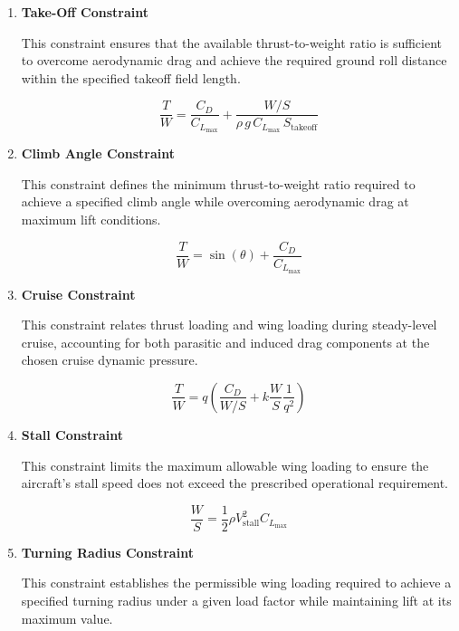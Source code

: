 \documentclass[10pt, letterpaper]{article}
\begin{document}
\begin{enumerate}

\item \textbf{Take-Off Constraint}

This constraint ensures that the available thrust-to-weight ratio is sufficient to overcome aerodynamic drag and achieve the required ground roll distance within the specified takeoff field length.

\begin{equation}
\label{eq:take_off_constraint}
\frac{T}{W} = \frac{C_D}{C_{L_{\max}}}
+ \frac{W/S}{\rho \, g \, C_{L_{\max}} \, S_{\text{takeoff}}}
\end{equation}

\item \textbf{Climb Angle Constraint}

This constraint defines the minimum thrust-to-weight ratio required to achieve a specified climb angle while overcoming aerodynamic drag at maximum lift conditions.

\begin{equation}
\label{eq:climb_angle_constraint}
\frac{T}{W} = \sin(\theta) + \frac{C_D}{C_{L_{\max}}}
\end{equation}

\item \textbf{Cruise Constraint}

This constraint relates thrust loading and wing loading during steady-level cruise, accounting for both parasitic and induced drag components at the chosen cruise dynamic pressure.

\begin{equation}
\label{eq:cruise_constraint}
\frac{T}{W}
= q \left(
\frac{C_D}{W/S}
+ k \frac{W}{S} \frac{1}{q^2}
\right)
\end{equation}

\item \textbf{Stall Constraint}

This constraint limits the maximum allowable wing loading to ensure the aircraft's stall speed does not exceed the prescribed operational requirement.

\begin{equation}
\label{eq:stall_contraint}
\frac{W}{S}
= \frac{1}{2} \rho V_{\text{stall}}^{2} {C_{L_{\max}}}
\end{equation}

\item \textbf{Turning Radius Constraint}

This constraint establishes the permissible wing loading required to achieve a specified turning radius under a given load factor while maintaining lift at its maximum value.

\end{enumerate}
\end{document}
